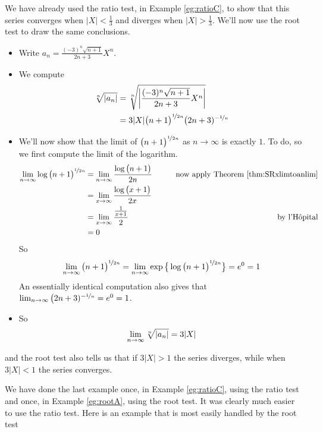 \begin{eg}[$\sum_{n=1}^\infty \frac{ (-3)^n \sqrt{n+1}}{2n+3}X^n$]
\label{eg:rootA}
 We have already used the ratio test, in Example \ref{eg:ratioC},
to show that this series converges when $|X|<\frac{1}{3}$ and diverges
when $|X|>\frac{1}{3}$. We'll now use the root test to draw the
same conclusions.
 \begin{itemize}
  \item  Write $a_n=  \frac{ (-3)^n \sqrt{n+1}}{2n+3}X^n$.
  \item We compute
 \begin{align*}
  \root{n}\of{|a_n|}
  &= \root{n}\of{ \bigg|\frac{ (-3)^n \sqrt{n+1}}{2n+3}X^n\bigg|}\\
  &= 3 |X|\big(n+1\big)^{\nicefrac{1}{2n}}  \big(2n+3)^{-\nicefrac{1}{n}}
\end{align*}
\item We'll now show that the limit of $\big(n+1\big)^{\nicefrac{1}{2n}}$
as $n\to\infty$ is exactly $1$. To do, so we first compute the limit
of the logarithm.
\begin{align*}
\lim_{n\to\infty}\log \big(n+1\big)^{\nicefrac{1}{2n}}
&=\lim_{n\to\infty}\frac{\log \big(n+1\big)}{2n}
\qquad&\text{now apply Theorem \ref{thm:SRxlimtoanlim}} \\
&=\lim_{x\to\infty}\frac{\log \big(x+1\big)}{2x} \\
&=\lim_{x\to\infty}\frac{\frac{1}{x+1}}{2}
\qquad&\text{by l'H\^opital} \\
&=0
\end{align*}
So
\begin{align*}
\lim_{n\to\infty}\big(n+1\big)^{\nicefrac{1}{2n}}
=\lim_{n\to\infty}\exp\big\{\log \big(n+1\big)^{\nicefrac{1}{2n}}\big\}
= e^0=1
\end{align*}
An essentially identical computation also gives that
$\lim_{n\to\infty}\big(2n+3)^{-\nicefrac{1}{n}} = e^0=1$.
\item So
\begin{align*}
\lim_{n\to\infty}\root{n}\of{|a_n|}
= 3 |X|
\end{align*}
\end{itemize}
and the root test also tells us that if $3|X|>1$ the series diverges,
while when $3|X|<1$ the series converges.
\end{eg}
We have done the last example once, in Example \ref{eg:ratioC},
using the ratio test and once, in Example \ref{eg:rootA},
using the root test. It was clearly much easier to use the ratio test.
Here is an example that is most easily handled by the root test


